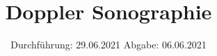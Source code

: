 

\subject{US§}
\title{Doppler Sonographie}
\date{%
  Durchführung: 29.06.2021
  \hspace{3em}
  Abgabe: 06.06.2021
}



\maketitle
\thispagestyle{empty}
\tableofcontents
\newpage



%




\printbibliography{}


